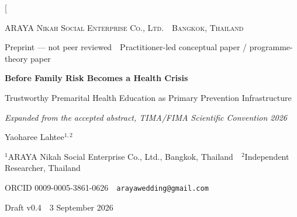 \documentclass[10pt,twocolumn]{article}
\title{}
\begin{document}
\twocolumn[
\begin{center}
{\footnotesize\textsc{ARAYA Nikah Social Enterprise Co., Ltd. \,\textbullet\, Bangkok, Thailand}}\par
{\scriptsize Preprint --- not peer reviewed \,\textbullet\, Practitioner-led conceptual paper / programme-theory paper}\par\vspace{4mm}
{\LARGE\bfseries\color{ocsi} Before Family Risk Becomes a Health Crisis}\par\vspace{1.5mm}
{\large Trustworthy Premarital Health Education as Primary Prevention Infrastructure}\par\vspace{1mm}
{\small\itshape Expanded from the accepted abstract, TIMA/FIMA Scientific Convention 2026}\par\vspace{4mm}
{\normalsize Yaoharee Lahtee$^{1,2}$}\par
{\small $^{1}$ARAYA Nikah Social Enterprise Co., Ltd., Bangkok, Thailand \,\textbullet\, $^{2}$Independent Researcher, Thailand}\par
{\small ORCID 0009-0005-3861-0626 \,\textbullet\, \texttt{arayawedding@gmail.com}}\par\vspace{2mm}
{\small Draft v0.4 \,\textbullet\, 3 September 2026}\par
\end{center}
\vspace{2mm}
\end{document}
